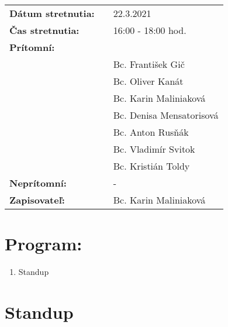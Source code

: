 \documentclass{article}
\begin{document}
    

    \begin{table}[h]
        \begin{tabular}{lllll}
            \multicolumn{3}{l}{\textbf{Dátum stretnutia:}} & & 22.3.2021 \\
            \multicolumn{3}{l}{\textbf{Čas stretnutia:}} & & 16:00 - 18:00 hod. \\
            \multicolumn{3}{l}{\textbf{Prítomní:}} \\
            & & & & Bc. František Gič  \\
            & & & & Bc. Oliver Kanát \\
            & & & & Bc. Karin Maliniaková \\
            & & & & Bc. Denisa Mensatorisová \\
            & & & & Bc. Anton Rusňák \\
            & & & & Bc. Vladimír Svitok \\
            & & & & Bc. Kristián Toldy \\
            \multicolumn{3}{l}{\textbf{Neprítomní:}} & & -\\
            \multicolumn{3}{l}{\textbf{Zapisovateľ:}} & & Bc. Karin Maliniaková \\
        \end{tabular}
        \label{tab:grades}
    \end{table}

    \section*{Program:}

    \begin{enumerate}
        \item Standup
    \end{enumerate}

    \section*{Standup}
\end{document}
